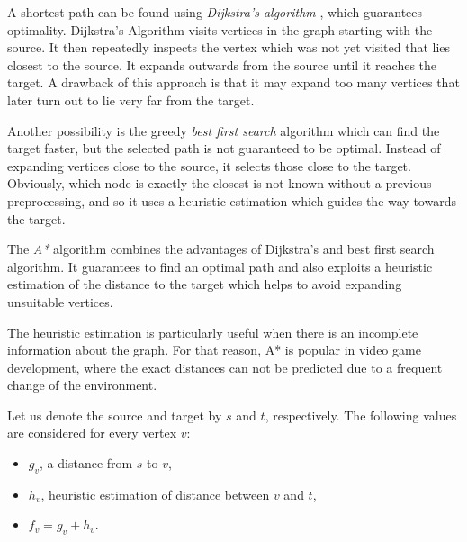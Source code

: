 A shortest path can be found using \emph{Dijkstra's algorithm} \cite{dijkstra59}, which guarantees optimality.
Dijkstra’s Algorithm visits vertices in the graph starting with the source. 
It then repeatedly inspects the vertex which was not yet visited that lies closest to the source. 
It expands outwards from the source until it reaches the target. 
A drawback of this approach is that it may expand too many vertices that later turn out to lie very far from the target.


Another possibility is the greedy \emph{best first search} algorithm which can find the target faster, but the selected path is not guaranteed to be optimal.
Instead of expanding vertices close to the source, it selects those close to the target.
Obviously, which node is exactly the closest is not known without a previous preprocessing, and so it uses a heuristic estimation which guides the way towards the target.


The \emph{A*} algorithm combines the advantages of Dijkstra's and best first search algorithm.
It guarantees to find an optimal path and also exploits a heuristic estimation of the distance to the target which helps to avoid expanding unsuitable vertices.

The heuristic estimation is particularly useful when there is an incomplete information about the graph.
For that reason, A* is popular in video game development, where the exact distances can not be predicted due to a frequent change of the environment. 

Let us denote the source and target by $s$ and $t$, respectively.
The following values are considered for every vertex $v$:
\begin{itemize}
	\item $g_v$, a distance from $s$ to $v$,
	\item $h_v$, heuristic estimation of distance between $v$ and $t$, 
	\item $f_v=g_v+h_v$.
\end{itemize}
